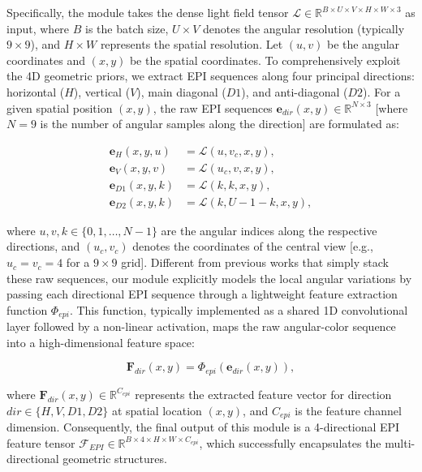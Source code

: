 Specifically, the module takes the dense light field tensor $\mathcal{L} \in \mathbb{R}^{B \times U \times V \times H \times W \times 3}$ as input, where $B$ is the batch size, $U \times V$ denotes the angular resolution (typically $9 \times 9$), and $H \times W$ represents the spatial resolution. Let $(u, v)$ be the angular coordinates and $(x, y)$ be the spatial coordinates. To comprehensively exploit the 4D geometric priors, we extract EPI sequences along four principal directions: horizontal ($H$), vertical ($V$), main diagonal ($D1$), and anti-diagonal ($D2$). For a given spatial position $(x, y)$, the raw EPI sequences $\mathbf{e}_{dir}(x, y) \in \mathbb{R}^{N \times 3}$  [where $N=9$ is the number of angular samples along the direction] are formulated as:

\begin{align}

\mathbf{e}_{H}(x, y, u) &= \mathcal{L}(u, v_c, x, y), \\
\mathbf{e}_{V}(x, y, v) &= \mathcal{L}(u_c, v, x, y), \\
\mathbf{e}_{D1}(x, y, k) &= \mathcal{L}(k, k, x, y), \\
\mathbf{e}_{D2}(x, y, k) &= \mathcal{L}(k, U-1-k, x, y),

\end{align}

where $u, v, k \in \{0, 1, \dots, N-1\}$ are the angular indices along the respective directions, and $(u_c, v_c)$ denotes the coordinates of the central view  [e.g., $u_c = v_c = 4$ for a $9 \times 9$ grid]. Different from previous works that simply stack these raw sequences, our module explicitly models the local angular variations by passing each directional EPI sequence through a lightweight feature extraction function $\Phi_{epi}$. This function, typically implemented as a shared 1D convolutional layer followed by a non-linear activation, maps the raw angular-color sequence into a high-dimensional feature space:

\begin{equation}
\label{eq:eq32}
\mathbf{F}_{dir}(x, y) = \Phi_{epi}(\mathbf{e}_{dir}(x, y)),
\end{equation}

where $\mathbf{F}_{dir}(x, y) \in \mathbb{R}^{C_{epi}}$ represents the extracted feature vector for direction $dir \in \{H, V, D1, D2\}$ at spatial location $(x, y)$, and $C_{epi}$ is the feature channel dimension. Consequently, the final output of this module is a 4-directional EPI feature tensor $\mathcal{F}_{EPI} \in \mathbb{R}^{B \times 4 \times H \times W \times C_{epi}}$, which successfully encapsulates the multi-directional geometric structures.

